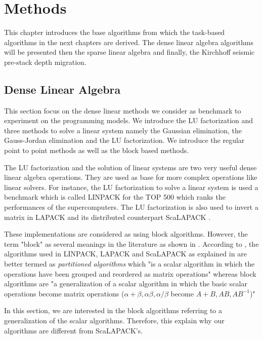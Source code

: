 \chapter{Methods \label{chap:methods}}
\graphicspath{{chapters/methods/}}
This chapter introduces the base algorithms from which the task-based algorithms in the next chapters are derived.
The dense linear algebra algorithms will be presented then the sparse linear algebra and finally, the Kirchhoff seismic pre-stack depth migration.

\section{Dense Linear Algebra}

This section focus on the dense linear methods we consider as benchmark to experiment on the programming models.
We introduce the LU factorization and three methods to solve a linear system namely the Gaussian elimination, the Gauss-Jordan elimination and the LU factorization.
We introduce the regular point to point methods as well as the block based methods.


The LU factorization and the solution of linear systems are two very useful dense linear algebra operations.
They are used as base for more complex operations like linear solvers.
For instance, the LU factorization to solve a linear system is used a benchmark which is called LINPACK \cite{Parle1981} \cite{DonLP2003} for the TOP 500 which ranks the performances of the supercomputers.
The LU factorization is also used to invert a matrix in LAPACK \cite{ABBBD1999} and its distributed counterpart ScaLAPACK \cite{ChDPW1992} \cite{BCCDD1996}.

These implementations are considered as using block algorithms.
However, the term "block" as several meanings in the literature as shown in \cite{DemHS1995}.
According to \cite{DemHS1995}, the algorithms used in LINPACK, LAPACK and ScaLAPACK as explained in \cite{CDOPW1996} are better termed as \textit{partitioned algorithms} which "is a scalar algorithm in which the operations have been grouped and reordered as matrix operations" whereas block algorithms are "a generalization of a scalar algorithm in which the basic scalar operations become matrix operations ($\alpha + \beta, \alpha\beta, \alpha / \beta$ become $A+B, AB, AB^{-1}$)"

In this section, we are interested in the block algorithms referring to a generalization of the scalar algorithms.
Therefore, this explain why our algorithms are different from ScaLAPACK's.


